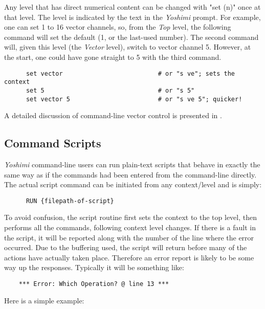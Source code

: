    Any level that has direct numerical content can be changed with "set (n)"
   once at that level.  The level is indicated by the text in the
   \textsl{Yoshimi} prompt.
   For example, one can set 1 to 16 vector channels, so, from the
   \textsl{Top} level, the following command will set the default (1, or the
   last-used number). The second command will, given this level (the
   \textsl{Vector} level), switch to vector channel 5. However, at the start,
   one could have gone straight to 5 with the third command.

   \begin{verbatim}
      set vector                          # or "s ve"; sets the context
      set 5                               # or "s 5"
      set vector 5                        # or "s ve 5"; quicker!
   \end{verbatim}

   A detailed discussion of command-line vector control is presented in
   .

\subsection{Command Scripts}
\label{subsec:command_line_command_scripts}

   \textsl{Yoshimi} command-line users can run plain-text scripts that behave
   in exactly the same way as if the commands had been entered from the
   command-line directly.
   The actual script command can be initiated from any context/level and is
   simply:

   \begin{verbatim}
      RUN {filepath-of-script}
   \end{verbatim}

   To avoid confusion, the script routine first sets the context to the top
   level, then performs all the commands, following context level changes. If
   there is a fault in the script, it will be reported along with the number
   of the line where the error occurred. Due to the buffering used, the
   script will return before many of the actions have actually taken place.
   Therefore an error report is likely to be some way up the responses.
   Typically it will be something like:

   \begin{verbatim}
    *** Error: Which Operation? @ line 13 ***
   \end{verbatim}

   Here is a simple example:

